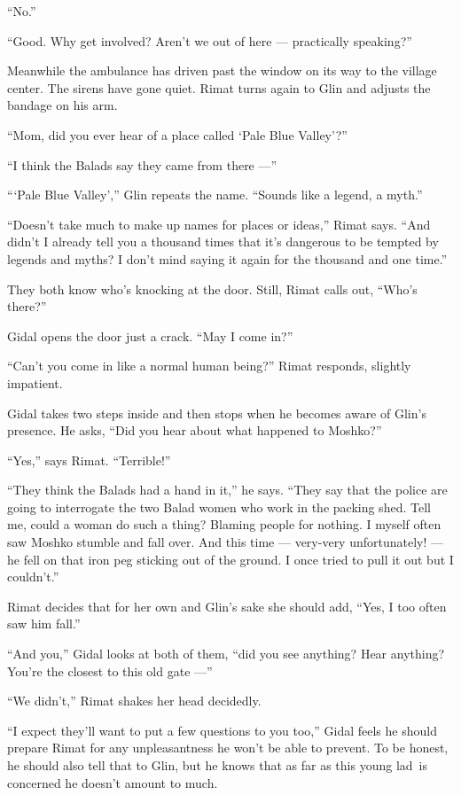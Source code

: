 \documentclass[twoside,11pt]{book}
\begin{document}
``No.''

``Good. Why get involved? Aren't we out of here --- practically speaking?''

Meanwhile the ambulance has driven past the window on its way to the village center. The sirens have gone quiet. Rimat
turns again to Glin and adjusts the bandage on his arm.

``Mom, did you ever hear of a place called `Pale Blue Valley'?''

``I think the Balads say they came from there ---''

``{\thinspace}`Pale Blue Valley','' Glin repeats the name. ``Sounds like a legend, a
myth.''

``Doesn't take much to make up names for places or ideas,'' Rimat says. ``And
didn't I already tell you a thousand times that it's dangerous to be tempted by legends and myths? I don't mind saying
it again for the thousand and one time.''

They both know who's knocking at the door. Still, Rimat calls out, ``Who's there?''

Gidal opens the door just a crack. ``May I come in?''

``Can't you come in like a normal human being?'' Rimat responds, slightly
impatient.

Gidal takes two steps inside and then stops when he becomes aware of Glin's presence. He asks, ``Did you
hear about what happened to Moshko?''

``Yes,'' says Rimat. ``Terrible!''

``They think the Balads had a hand in it,'' he says. ``They say that the police
are going to interrogate the two Balad women who work in the packing shed. Tell me, could a woman do such a thing?
Blaming people for nothing. I myself often saw Moshko stumble and fall over. And this time --- very-very unfortunately!
--- he fell on that iron peg sticking out of the ground. I once tried to pull it out but I couldn't.''

Rimat decides that for her own and Glin's sake she should add, ``Yes, I too often saw him
fall.''

``And you,'' Gidal looks at both of them, ``did you see anything? Hear anything?
You're the closest to this old gate ---''

``We didn't,'' Rimat shakes her head decidedly.

``I expect they'll want to put a few questions to you too,'' Gidal feels he should prepare
Rimat for any unpleasantness he won't be able to prevent. To be honest, he should also tell that to Glin, but he knows
that as far as this young lad~is concerned he doesn't amount to much.
\end{document}
